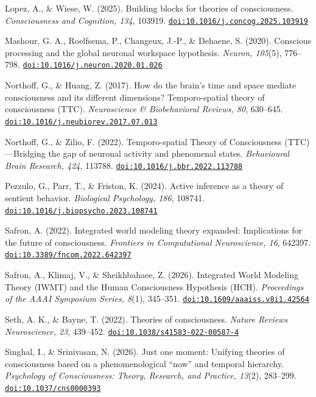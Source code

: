 \documentclass[
  11pt,
  a4paper,
]{article}
\begin{document}
Lopez, A., \& Wiese, W. (2025). Building blocks for theories of
consciousness. \emph{Consciousness and Cognition, 134}, 103919.
\href{https://doi.org/10.1016/j.concog.2025.103919}{\nolinkurl{doi:10.1016/j.concog.2025.103919}}

Mashour, G. A., Roelfsema, P., Changeux, J.-P., \& Dehaene, S. (2020).
Conscious processing and the global neuronal workspace hypothesis.
\emph{Neuron, 105}(5), 776--798.
\href{https://doi.org/10.1016/j.neuron.2020.01.026}{\nolinkurl{doi:10.1016/j.neuron.2020.01.026}}

Northoff, G., \& Huang, Z. (2017). How do the brain's time and space
mediate consciousness and its different dimensions? Temporo-spatial
theory of consciousness (TTC). \emph{Neuroscience \& Biobehavioral
Reviews, 80}, 630--645.
\href{https://doi.org/10.1016/j.neubiorev.2017.07.013}{\nolinkurl{doi:10.1016/j.neubiorev.2017.07.013}}

Northoff, G., \& Zilio, F. (2022). Temporo-spatial Theory of
Consciousness (TTC)---Bridging the gap of neuronal activity and
phenomenal states. \emph{Behavioural Brain Research, 424}, 113788.
\href{https://doi.org/10.1016/j.bbr.2022.113788}{\nolinkurl{doi:10.1016/j.bbr.2022.113788}}

Pezzulo, G., Parr, T., \& Friston, K. (2024). Active inference as a
theory of sentient behavior. \emph{Biological Psychology, 186}, 108741.
\href{https://doi.org/10.1016/j.biopsycho.2023.108741}{\nolinkurl{doi:10.1016/j.biopsycho.2023.108741}}

Safron, A. (2022). Integrated world modeling theory expanded:
Implications for the future of consciousness. \emph{Frontiers in
Computational Neuroscience, 16}, 642397.
\href{https://doi.org/10.3389/fncom.2022.642397}{\nolinkurl{doi:10.3389/fncom.2022.642397}}

Safron, A., Klimaj, V., \& Sheikhbahaee, Z. (2026). Integrated World
Modeling Theory (IWMT) and the Human Consciousness Hypothesis (HCH).
\emph{Proceedings of the AAAI Symposium Series, 8}(1), 345--351.
\href{https://doi.org/10.1609/aaaiss.v8i1.42564}{\nolinkurl{doi:10.1609/aaaiss.v8i1.42564}}

Seth, A. K., \& Bayne, T. (2022). Theories of consciousness.
\emph{Nature Reviews Neuroscience, 23}, 439--452.
\href{https://doi.org/10.1038/s41583-022-00587-4}{\nolinkurl{doi:10.1038/s41583-022-00587-4}}

Singhal, I., \& Srinivasan, N. (2026). Just one moment: Unifying
theories of consciousness based on a phenomenological ``now'' and
temporal hierarchy. \emph{Psychology of Consciousness: Theory, Research,
and Practice, 13}(2), 283--299.
\href{https://doi.org/10.1037/cns0000393}{\nolinkurl{doi:10.1037/cns0000393}}
\end{document}
